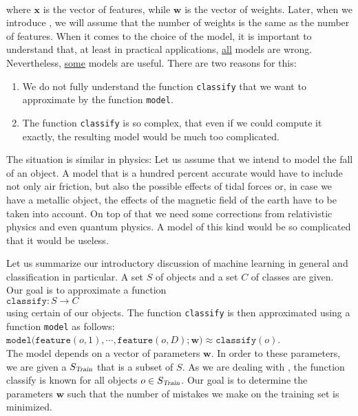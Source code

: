 \\[0.2cm]
where $\mathbf{x}$ is the vector of features, while $\mathbf{w}$ is the vector of weights.  Later, when we
introduce , we will assume that the number of weights is the same as the number of features.
When it comes to the choice of the model, it is important to 
understand that, at least in practical applications, \underline{all} models are wrong.  Nevertheless, \underline{some}
models are useful.  There are two reasons for this:
\begin{enumerate}
\item We do not fully understand the function \texttt{classify} that we want to approximate by the function \texttt{model}.
\item The function \texttt{classify} is so complex, that even if we could compute it exactly, the resulting model 
      would be much too complicated.
\end{enumerate}
The situation is similar in physics: Let us assume that we intend to model the fall of an object.  A model that is a
hundred percent accurate would have to include not only air friction, but also the possible effects of tidal forces or,
in case we have a metallic object, the effects of the magnetic field of the earth have to be taken into account.  On top
of that we need some corrections from relativistic physics and even quantum physics.  A model of this kind
would be so complicated that it would be useless. 


Let us summarize our introductory discussion of machine learning in general and classification in particular.
A set $S$ of objects and a set $C$ of classes are given.  Our goal is to approximate a function
\\[0.2cm]
\hspace*{1.3cm}
$\mathtt{classify}: S \rightarrow C$
\\[0.2cm]
using certain  of our objects.  The function \texttt{classify} is then approximated using a function
\texttt{model} as follows:
\\[0.2cm]
\hspace*{1.3cm}
$\mathtt{model}\bigl(\mathtt{feature}(o,1), \cdots, \mathtt{feature}(o,D); \mathbf{w}\bigr) \approx \mathtt{classify}(o)$.
\\[0.2cm]
The model depends on a vector of parameters $\mathbf{w}$.  In order to  these parameters, we are given a 
 $S_\textsl{Train}$ that is a subset of $S$.  As we are dealing with , the function 
classify is known for all objects $o \in S_\textsl{Train}$.   Our goal is to determine the parameters $\mathbf{w}$ such that the
number of mistakes we make on the training set is minimized.  


